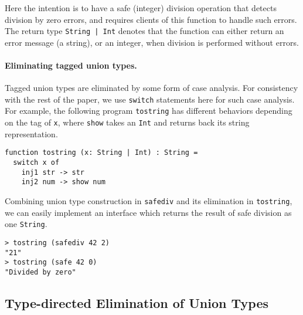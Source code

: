 \noindent Here the intention is to have a safe (integer) division operation that detects
division by zero errors, and requires clients of this function to handle
such errors. The return type \lstinline{String | Int} denotes that the function
can either return an error message (a string), or an integer, when division
is performed without errors.

\paragraph{Eliminating tagged union types.}
Tagged union types are eliminated by some form of case analysis.
For consistency with the rest of the paper, we use
\lstinline{switch} statements here for such case analysis. For example,
the following program \lstinline{tostring} has different behaviors depending on the
tag of \lstinline{x}, where \lstinline{show} takes an \lstinline{Int} and
returns back its string representation.

\begin{lstlisting}
function tostring (x: String | Int) : String =
  switch x of
    inj1 str -> str
    inj2 num -> show num
\end{lstlisting}

Combining union type construction in \lstinline{safediv} and its elimination in
\lstinline{tostring}, we can easily implement an interface which returns the
result of safe division as one \lstinline{String}.

\begin{lstlisting}
> tostring (safediv 42 2)
"21"
> tostring (safe 42 0)
"Divided by zero"
\end{lstlisting}


\subsection{Type-directed Elimination of Union Types}



